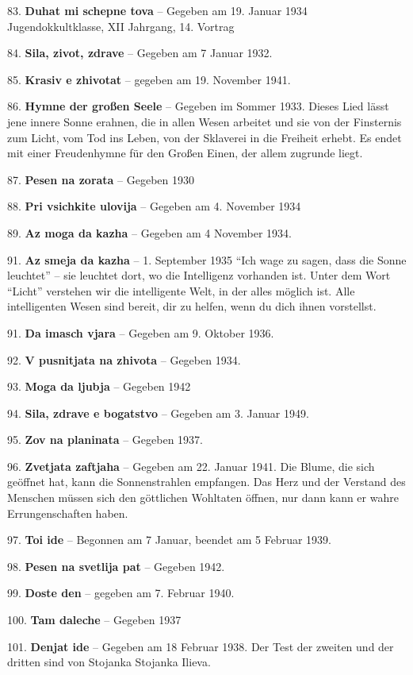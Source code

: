\documentclass[11pt,a5paper,twoside]{article}
\begin{document}
83. \textbf{Duhat mi schepne tova} -- Gegeben am 19. Januar 1934 Jugendokkultklasse, XII Jahrgang, 14. Vortrag

84. \textbf{Sila, zivot, zdrave} -- Gegeben am 7 Januar 1932.

85. \textbf{Krasiv e zhivotat} -- gegeben am 19. November 1941.

86. \textbf{Hymne der großen Seele} -- Gegeben im Sommer 1933. Dieses Lied lässt jene innere Sonne erahnen, die in allen Wesen arbeitet und sie von der Finsternis zum Licht, vom Tod ins Leben, von der Sklaverei in die Freiheit erhebt. Es endet mit einer Freudenhymne für den Großen Einen, der allem zugrunde liegt.

87. \textbf{Pesen na zorata} -- Gegeben 1930 

88. \textbf{Pri vsichkite ulovija} -- Gegeben am 4. November 1934

89. \textbf{Az moga da kazha} -- Gegeben am 4 November 1934.

91. \textbf{Az smeja da kazha } -- 1. September 1935 "`Ich wage zu sagen, dass die Sonne leuchtet"' -- sie leuchtet dort, wo die Intelligenz vorhanden ist. Unter dem Wort "`Licht"' verstehen wir die intelligente Welt, in der alles möglich ist. Alle intelligenten Wesen sind bereit, dir zu helfen, wenn du dich ihnen vorstellst.

91. \textbf{Da imasch vjara} -- Gegeben am 9. Oktober 1936.

92. \textbf{V pusnitjata na zhivota} -- Gegeben 1934. 

93. \textbf{Moga da ljubja} -- Gegeben 1942

94. \textbf{Sila, zdrave e bogatstvo} -- Gegeben am 3. Januar 1949. 

95. \textbf{Zov na planinata} -- Gegeben 1937.

96. \textbf{Zvetjata zaftjaha} -- Gegeben am 22. Januar 1941. Die Blume, die sich geöffnet hat, kann die Sonnenstrahlen empfangen. Das Herz und der Verstand des Menschen müssen sich den göttlichen Wohltaten öffnen, nur dann kann er wahre Errungenschaften haben.

97. \textbf{Toi ide} -- Begonnen am 7 Januar, beendet am 5 Februar 1939.

98. \textbf{Pesen na svetlija pat} -- Gegeben 1942.

99. \textbf{Doste den} -- gegeben am 7. Februar 1940.

100. \textbf{Tam daleche} -- Gegeben 1937

101. \textbf{Denjat ide} -- Gegeben am 18 Februar 1938. Der Test der zweiten und der dritten sind von Stojanka Stojanka Ilieva. 
\end{document}
